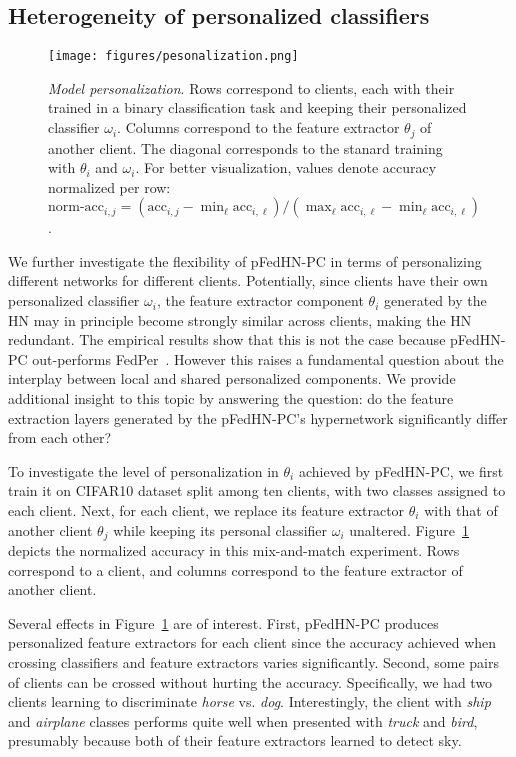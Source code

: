 \documentclass{article}
\newcommand\ourmethod{pFedHN}
\begin{document}
\subsection{Heterogeneity of personalized classifiers}

\begin{figure}[ht]
    \centering
    \texttt{[image: figures/pesonalization.png]}
    \caption{\textit{Model personalization}. Rows correspond to clients, each with their trained in a binary classification task and keeping their personalized classifier $\omega_i$. Columns correspond to the feature extractor $\theta_j$ of another client. The diagonal corresponds to the stanard training with $\theta_i$ and $\omega_i$. For better visualization, values denote accuracy normalized per row:  $\text{norm-acc}_{i,j}=(\text{acc}_{i,j}-\min_{\ell}{\text{acc}_{i,\ell}}) / (\max_{\ell}{\text{acc}_{i,\ell}}-\min_{\ell}{\text{acc}_{i,\ell}})$.}
    \label{fig:personalized_fe}
\end{figure}



We further investigate the flexibility of \ourmethod{}-PC in terms of personalizing different networks for different clients. 
Potentially, since clients have their own personalized classifier $\omega_i$, the feature extractor component $\theta_i$ generated by the HN may in principle become strongly similar across clients, making the HN redundant. The empirical results show that this is not the case because \ourmethod{}-PC out-performs FedPer~\cite{arivazhagan2019federated}. However this raises a fundamental question about the interplay between local and shared personalized components. We provide additional insight to this topic by answering the question: do the feature extraction layers generated by the \ourmethod{}-PC's hypernetwork significantly differ from each other?




To investigate the level of personalization in $\theta_i$ achieved by \ourmethod{}-PC, we first train it on CIFAR10 dataset split among ten clients, with two classes assigned to each client. Next, for each client, we replace its feature extractor $\theta_i$ with that of another client $\theta_j$ while keeping its personal classifier $\omega_i$ unaltered. 
Figure~\ref{fig:personalized_fe} depicts the normalized accuracy in this mix-and-match experiment. Rows correspond to a client, and columns correspond to the feature extractor of another client. 

Several effects in Figure~\ref{fig:personalized_fe} are of interest. First, \ourmethod{}-PC produces personalized feature extractors for each client since the accuracy achieved when crossing classifiers and feature extractors varies significantly. Second, some pairs of clients can be crossed without hurting the accuracy. Specifically, we had two clients learning to discriminate \textit{horse} vs. \textit{dog}. Interestingly, the client with \textit{ship} and \textit{airplane} classes performs quite well when presented with \textit{truck} and \textit{bird}, presumably because both of their feature extractors learned to detect sky. 
\end{document}
